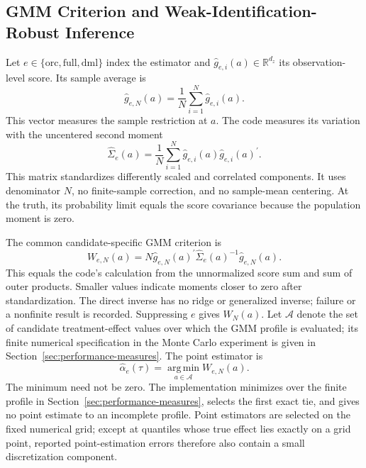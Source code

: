 \subsection{GMM Criterion and Weak-Identification-Robust Inference}

Let $e\in\{\mathrm{orc},\mathrm{full},\mathrm{dml}\}$ index the estimator and $\widehat g_{e,i}(a)\in\mathbb{R}^{d_z}$ its observation-level score. Its sample average is
\begin{equation}
    \widehat g_{e,N}(a)
    =
    \frac{1}{N}\sum_{i=1}^{N}\widehat g_{e,i}(a).
    \label{eq:sample-gmm-moment}
\end{equation}
This vector measures the sample restriction at $a$. The code measures its variation with the uncentered second moment
\begin{equation}
    \widehat\Sigma_e(a)
    =
    \frac{1}{N}\sum_{i=1}^{N}
    \widehat g_{e,i}(a)\widehat g_{e,i}(a)^{\prime}.
    \label{eq:score-covariance}
\end{equation}
This matrix standardizes differently scaled and correlated components. It uses denominator $N$, no finite-sample correction, and no sample-mean centering. At the truth, its probability limit equals the score covariance because the population moment is zero.

The common candidate-specific GMM criterion is
\begin{equation}
    W_{e,N}(a)
    =
    N\widehat g_{e,N}(a)^{\prime}
    \widehat\Sigma_e(a)^{-1}
    \widehat g_{e,N}(a).
    \label{eq:gmm-criterion}
\end{equation}
This equals the code's calculation from the unnormalized score sum and sum of outer products. Smaller values indicate moments closer to zero after standardization. The direct inverse has no ridge or generalized inverse; failure or a nonfinite result is recorded. Suppressing $e$ gives $W_N(a)$. Let $\mathcal A$ denote the set of candidate treatment-effect values over which the GMM profile is evaluated; its finite numerical specification in the Monte Carlo experiment is given in Section~\ref{sec:performance-measures}. The point estimator is
\begin{equation}
    \widehat\alpha_e(\tau)
    =
    \operatorname*{arg\,min}_{a\in\mathcal A}W_{e,N}(a).
    \label{eq:gmm-point-estimator}
\end{equation}
The minimum need not be zero. The implementation minimizes over the finite profile in Section~\ref{sec:performance-measures}, selects the first exact tie, and gives no point estimate to an incomplete profile. Point estimators are selected on the fixed numerical grid; except at quantiles whose true effect lies exactly on a grid point, reported point-estimation errors therefore also contain a small discretization component.

